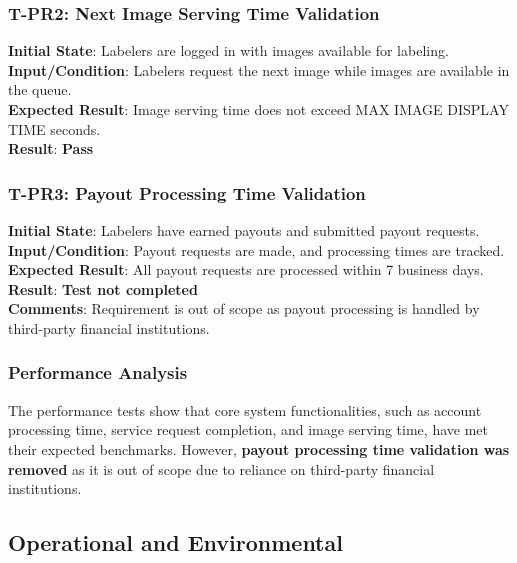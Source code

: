 \documentclass[12pt, titlepage]{article}
\begin{document}
\subsubsection{T-PR2: Next Image Serving Time Validation}
\textbf{Initial State}: Labelers are logged in with images available for labeling.\\
\textbf{Input/Condition}: Labelers request the next image while images are available in the queue.\\
\textbf{Expected Result}: Image serving time does not exceed MAX IMAGE DISPLAY TIME seconds.\\
\textbf{Result}: \textbf{Pass}

\subsubsection{T-PR3: Payout Processing Time Validation}
\textbf{Initial State}: Labelers have earned payouts and submitted payout requests.\\
\textbf{Input/Condition}: Payout requests are made, and processing times are tracked.\\
\textbf{Expected Result}: All payout requests are processed within 7 business days.\\
\textbf{Result}: \textbf{Test not completed}\\
\textbf{Comments}: Requirement is out of scope as payout processing is handled by third-party financial institutions.

\subsubsection{Performance Analysis}
The performance tests show that core system functionalities, such as account processing time, service request completion, and image serving time, have met their expected benchmarks. However, \textbf{payout processing time validation was removed} as it is out of scope due to reliance on third-party financial institutions.
\subsection{Operational and Environmental}
\end{document}
